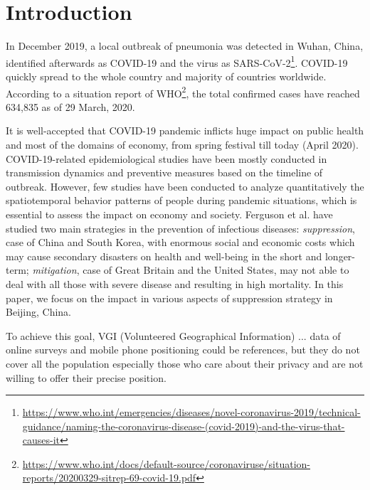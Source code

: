 \documentclass[preprints,ijgi,submit,moreauthors]{Definitions/mdpi}
\begin{document}
\section{Introduction}
In December 2019, a local outbreak of pneumonia was detected in Wuhan, China, identified afterwards as COVID-19 and the virus as SARS-CoV-2\footnote{\url{https://www.who.int/emergencies/diseases/novel-coronavirus-2019/technical-guidance/naming-the-coronavirus-disease-(covid-2019)-and-the-virus-that-causes-it}}.
COVID-19 quickly spread to the whole country and majority of countries worldwide.
According to a situation report of WHO\footnote{\url{https://www.who.int/docs/default-source/coronaviruse/situation-reports/20200329-sitrep-69-covid-19.pdf}}, the total confirmed cases have reached 634,835 as of 29 March, 2020.

It is well-accepted that COVID-19 pandemic inflicts huge impact on public health and most of the domains of economy, from spring festival till today (April 2020).
COVID-19-related epidemiological studies have been mostly conducted in transmission dynamics \cite{li2020early,pitzer2009demographic} and preventive measures \cite{chinazzi2020effect,van2006today} based on the timeline of outbreak.
However, few studies have been conducted to analyze quantitatively the spatiotemporal behavior patterns of people during pandemic situations, which is essential to assess the impact on economy and society.
Ferguson et al. \cite{ferguson2020report} have studied two main strategies in the prevention of infectious diseases: \textit{suppression}, case of China and South Korea, with enormous social and economic costs which may cause secondary disasters on health and well-being in the short and longer-term;
\textit{mitigation}, case of Great Britain and the United States, may not able to deal with all those with severe disease and resulting in high mortality.
In this paper, we focus on the impact in various aspects of suppression strategy in Beijing, China.

To achieve this goal, VGI (Volunteered Geographical Information) ...
 data of online surveys and mobile phone positioning could be references, but they do not cover all the population especially those who care about their privacy and are not willing to offer their precise position.
\end{document}
